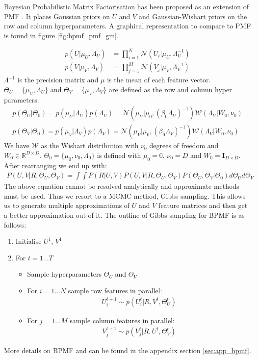 Bayesian Probabilistic Matrix Factorisation has been proposed as an extension of PMF \cite{SalMnih2008}. It places Gaussian priors on $U$ and $V$ and Gaussian-Wishart priors on the row and column hyperparameters. A graphical representation to compare to PMF is found in figure \ref{fig:bpmf_pmf_gm}.

\begin{align*}
p(U|\mu_U,\Lambda_U) &= \prod\limits_{i=1}^{N} \mathcal{N}(U_i|\mu_U,\Lambda_U^{-1})\\
p(V|\mu_V,\Lambda_V) &= \prod\limits_{j=1}^{M} \mathcal{N}(V_j|\mu_V,\Lambda_V^{-1})
\end{align*}
$\Lambda^{-1}$ is the precision matrix and $\mu$ is the mean of each feature vector. $\Theta_U=\{\mu_U,\Lambda_U\}$ and $\Theta_V=\{\mu_V,\Lambda_V\}$ are defined as the row and column hyper parameters.
\begin{align*}
p(\Theta_U|\Theta_0) = p(\mu_U|\Lambda_U)p(\Lambda_U)= \mathcal{N}(\mu_U|\mu_0,(\beta_0 \Lambda_U)^{-1})\mathcal{W}(\Lambda_U|W_0, \nu_0) \\
p(\Theta_V|\Theta_0) = p(\mu_V|\Lambda_V)p(\Lambda_V)= \mathcal{N}(\mu_V|\mu_0,(\beta_0 \Lambda_V)^{-1})\mathcal{W}(\Lambda_V|W_0, \nu_0)
\end{align*}
We have $\mathcal{W}$ as the Wishart distribution with $\nu_0$ degrees of freedom and $W_0 \in \mathbb{R}^{D \times D}$. $\Theta_0=\{\mu_0,\nu_0,\Lambda_0\}$ is defined with $\mu_0=0$, $\nu_0=D$ and $W_0=\mathbf{I}_{D\times D}$.
After rearranging we end up with:
\begin{align*}
P(U,V|R,\Theta_U,\Theta_V) =\int \int P(R | U,V) P(U,V | R,\Theta_U,\Theta_V) P(\Theta_U,\Theta_V | \Theta_0)d\Theta_U d\Theta_V
\end{align*}
The above equation cannot be resolved analytically and approximate methods must be used. Thus we resort to a MCMC method, Gibbs sampling. This allows us to generate multiple approximations of $U$ and $V$ feature matrices and then get a better approximation out of it.
The outline of Gibbs sampling for BPMF is as follows:
\begin{enumerate}
  \item Initialise $U^1$, $V^1$
  \item For $t=1\dots T$
	\begin{itemize}
	  \item Sample hyperparameters $\Theta_U$ and $\Theta_V$
	  \item For $i=1 \dots N$ sample row features in parallel:
	  \begin{align*}
	  U_i^{t+1} \sim p(U_i^t|R, V^t ,\Theta_U^t)
	  \end{align*}
	  \item For $j=1 \dots M$ sample column features in parallel:
	  \begin{align*}
	  V_j^{t+1} \sim p(V_j^t|R, U^t ,\Theta_V^t)
	  \end{align*}
	\end{itemize}
\end{enumerate}
More details on BPMF and can be found in the appendix section \ref{sec:app_bpmf}.

